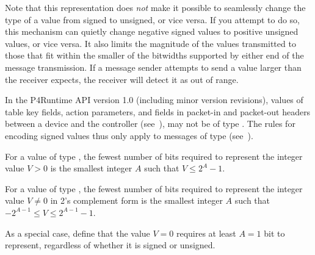 \documentclass[11pt]{article}
\begin{document}
{%
Note that this representation does \emph{not} make it possible to seamlessly change
the type of a value from signed to unsigned, or vice versa.  If you attempt to
do so, this mechanism can quietly change negative signed values to positive
unsigned values, or vice versa.  It also limits the magnitude of the values
transmitted to those that fit within the smaller of the bitwidths supported by
either end of the message transmission.  If a message sender attempts to send a
value larger than the receiver expects, the receiver will detect it as out of
range.%

In the P4Runtime API version 1.0 (including minor version revisions), values
of table key fields, action parameters, and fields in packet-in and packet-out
headers between a device and the controller (see~),
may not be of type . The rules for encoding signed values thus only
apply to messages of type  (see~).%

For a value of type , the fewest number of bits required to represent
the integer value $V > 0$ is the smallest integer $A$ such that $V \leq 2^A -1$.%

For a value of type , the fewest number of bits required to represent
the integer value $V \neq 0$ in 2's complement form is the smallest integer $A$
such that $-2^{A-1} \leq V \leq 2^{A-1} - 1$.%

As a special case, define that the value $V=0$ requires at least $A=1$ bit to
represent, regardless of whether it is signed or unsigned.%

}
\end{document}
